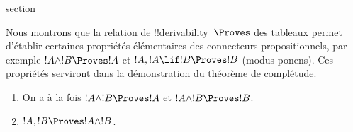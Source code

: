 \documentclass[11pt,a4paper,openany]{memoir}
\begin{document}
\endgroup



\begingroup
\expandafter\def\csname ol@sectioncs\endcsname{section}
\def\olfilename{provability-propositional}


      {}
      {}


\begin{explain}
Nous montrons que la relation de !!{derivability}~$\Proves$ des
tableaux permet d'établir certaines propriétés élémentaires des
connecteurs propositionnels, par exemple $!A \land !B \Proves !A$ et
$!A, !A \lif !B \Proves !B$ (modus ponens). Ces propriétés serviront
dans la démonstration du théorème de complétude.
\end{explain}

\begin{prop}
  \begin{enumerate}
  \item {} On a à la fois
    $!A \land !B \Proves !A$ et $!A \land !B \Proves !B$.
  \item {} $!A, !B \Proves !A \land
    !B$.
  \end{enumerate}
\end{prop}
\end{document}
